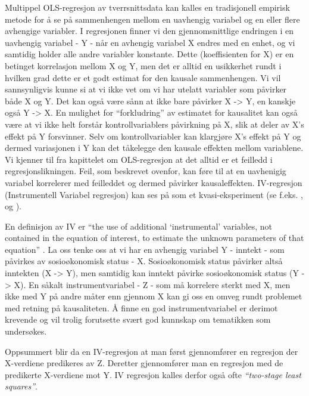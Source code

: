 \documentclass[
]{article}
\begin{document}
Multippel OLS-regresjon av tverrsnittsdata kan kalles en tradisjonell empirisk metode for å se på sammenhengen mellom en uavhengig variabel og en eller flere avhengige variabler. I regresjonen finner vi den gjennomsnittlige endringen i en uavhengig variabel - Y - når en avhengig variabel X endres med en enhet, og vi samtidig holder alle andre variabler konstante. Dette (koeffisienten for X) er en betinget korrelasjon mellom X og Y, men det er alltid en usikkerhet rundt i hvilken grad dette er et godt estimat for den kausale sammenhengen. Vi vil sannsynligvis kunne si at vi ikke vet om vi har utelatt variabler som påvirker både X og Y. Det kan også være sånn at ikke bare påvirker X -\textgreater{} Y, en kanskje også Y -\textgreater{} X. En mulighet for ``forkludring'' av estimatet for kausalitet kan også være at vi ikke helt forstår kontrollvariablers påvirkning på X, slik at deler av X's effekt på Y forsvinner. Selv om kontrollvariabler kan klargjøre X's effekt på Y og dermed variasjonen i Y kan det tåkelegge den kausale effekten mellom variablene. Vi kjenner til fra kapittelet om OLS-regresjon at det alltid er et feilledd i regresjonslikningen. Feil, som beskrevet ovenfor, kan føre til at en uavhenigig variabel korrelerer med feilleddet og dermed påvirker kausaleffekten. IV-regresjon (Instrumentell Variabel regresjon) kan ses på som et kvasi-eksperiment (se f.eks. \citet{galianiEffectAidGrowth2017}, \citet{andrianoCausalEffectMaternal2019} og \citet{dipreteGeneticInstrumentalVariable2018}).

En definisjon av IV er ``the use of additional `instrumental' variables, not contained in the equation of interest, to estimate the unknown parameters of that equation'' \citep[s.179]{stockWhoInventedInstrumental2003a}. La oss tenke oss at vi har en avhengig variabel Y - inntekt - som påvirkes av sosioøkonomisk status - X. Sosioøkonomisk status påvirker altså inntekten (X -\textgreater{} Y), men samtidig kan inntekt påvirke sosioøkonomisk status (Y -\textgreater{} X). En såkalt instrumentvariabel - Z - som må korrelere sterkt med X, men ikke med Y på andre måter enn gjennom X kan gi oss en omveg rundt problemet med retning på kausaliteten. Å finne en god instrumentvariabel er derimot krevende og vil trolig forutsette svært god kunnskap om tematikken som undersøkes.

Oppsummert blir da en IV-regresjon at man først gjennomfører en regresjon der X-verdiene predikeres av Z. Deretter gjennomfører man en regresjon med de predikerte X-verdiene mot Y. IV regresjon kalles derfor også ofte \emph{``two-stage least squares''}.
\end{document}
